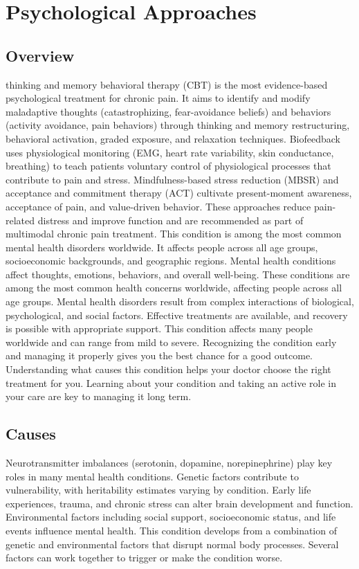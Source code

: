 \chapter{Psychological Approaches}
\label{sec:Psychological Approaches}

\section{Overview}
thinking and memory behavioral therapy (CBT) is the most evidence-based psychological treatment for chronic pain. It aims to identify and modify maladaptive thoughts (catastrophizing, fear-avoidance beliefs) and behaviors (activity avoidance, pain behaviors) through thinking and memory restructuring, behavioral activation, graded exposure, and relaxation techniques. Biofeedback uses physiological monitoring (EMG, heart rate variability, skin conductance, breathing) to teach patients voluntary control of physiological processes that contribute to pain and stress. Mindfulness-based stress reduction (MBSR) and acceptance and commitment therapy (ACT) cultivate present-moment awareness, acceptance of pain, and value-driven behavior. These approaches reduce pain-related distress and improve function and are recommended as part of multimodal chronic pain treatment. This condition is among the most common mental health disorders worldwide. It affects people across all age groups, socioeconomic backgrounds, and geographic regions. Mental health conditions affect thoughts, emotions, behaviors, and overall well-being. These conditions are among the most common health concerns worldwide, affecting people across all age groups. Mental health disorders result from complex interactions of biological, psychological, and social factors. Effective treatments are available, and recovery is possible with appropriate support. This condition affects many people worldwide and can range from mild to severe. Recognizing the condition early and managing it properly gives you the best chance for a good outcome. Understanding what causes this condition helps your doctor choose the right treatment for you. Learning about your condition and taking an active role in your care are key to managing it long term.

\section{Causes}
Neurotransmitter imbalances (serotonin, dopamine, norepinephrine) play key roles in many mental health conditions. Genetic factors contribute to vulnerability, with heritability estimates varying by condition. Early life experiences, trauma, and chronic stress can alter brain development and function. Environmental factors including social support, socioeconomic status, and life events influence mental health. This condition develops from a combination of genetic and environmental factors that disrupt normal body processes. Several factors can work together to trigger or make the condition worse.

